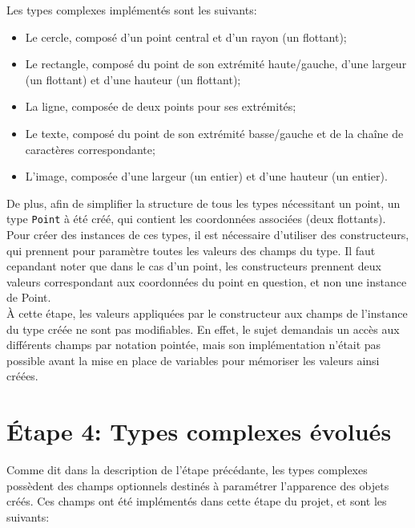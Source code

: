 \documentclass[a4paper, 12pt]{report}
\begin{document}
	Les types complexes implémentés sont les suivants:\\
	
	\begin{itemize}
		\item Le cercle, composé d'un point central et d'un rayon (un flottant);
		\item Le rectangle, composé du point de son extrémité haute/gauche, d'une largeur (un flottant) et d'une hauteur (un flottant);
		\item La ligne, composée de deux points pour ses extrémités;
		\item Le texte, composé du point de son extrémité basse/gauche et de la cha\^ine de caractères correspondante;
		\item L'image, composée d'une largeur (un entier) et d'une hauteur (un entier).\\
	\end{itemize}
	
	De plus, afin de simplifier la structure de tous les types nécessitant un point, un type \texttt{Point} à été créé, qui contient les coordonnées associées (deux flottants).\\
	
	Pour créer des instances de ces types, il est nécessaire d'utiliser des constructeurs, qui prennent pour paramètre toutes les valeurs des champs du type. Il faut cepandant noter que dans le cas d'un point, les constructeurs prennent deux valeurs correspondant aux coordonnées du point en question, et non une instance de Point.\\
	
	\`A cette étape, les valeurs appliquées par le constructeur aux champs de l'instance du type créée ne sont pas modifiables. En effet, le sujet demandais un accès aux différents champs par notation pointée, mais son implémentation n'était pas possible avant la mise en place de variables pour mémoriser les valeurs ainsi créées.
        
\chapter{\'Etape 4: Types complexes évolués}

	Comme dit dans la description de l'étape précédante, les types complexes possèdent des champs optionnels destinés à paramétrer l'apparence des objets créés. Ces champs ont été implémentés dans cette étape du projet, et sont les suivants:\\
	
\end{document}
